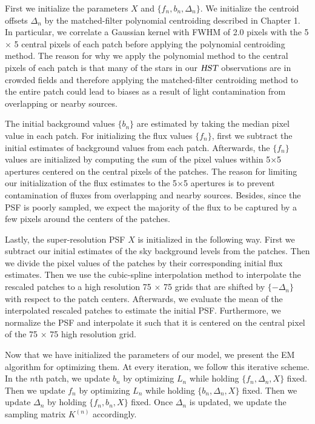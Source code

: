 First we initialize the parameters $X$ and $\{f_n , b_n , \Delta_n\}$. We initialize the centroid offsets ${\Delta_n}$ by the matched-filter polynomial centroiding 
described in Chapter 1. In particular, we correlate a Gaussian kernel with FWHM of 2.0 pixels with the 5 $\times$ 5 central pixels of each patch before applying 
the polynomial centroiding method. The reason for why we apply the polynomial method to the central pixels of each patch is that many of the stars in our ${\textsl{HST}}$ observations 
are in crowded fields and therefore applying the matched-filter centroiding method to the entire patch could lead to biases as a result of light contamination from overlapping 
or nearby sources. 

The initial background values $\{b_n\}$ are estimated by taking the median pixel value in each patch. For initializing the flux values $\{f_n\}$, first we subtract the initial 
estimates of background values from each patch. Afterwards, the $\{f_n\}$ values are initialized by computing the sum of the pixel values within 5$\times$5 apertures centered on 
the central pixels of the patches. The reason for limiting our initialization of the flux estimates to the 5$\times$5 apertures is to prevent contamination of fluxes from 
overlapping and nearby sources. Besides, since the PSF is poorly sampled, we expect the majority of the flux to be captured by a few pixels around the centers of the patches. 

Lastly, the super-resolution PSF $X$ is initialized in the following way. First we subtract our initial estimates of the sky background levels from the patches. Then we divide the 
pixel values of the patches by their corresponding initial flux estimates. Then we use the cubic-spline interpolation method to interpolate the rescaled patches to a high resolution 
75 $\times$ 75 grids that are shifted by $\{-\Delta_n\}$ with respect to the patch centers. Afterwards, we evaluate the mean of the interpolated rescaled patches 
to estimate the initial PSF. Furthermore, we normalize the PSF and interpolate it such that it is centered on the central pixel of the 75 $\times$ 75 high resolution grid.  

Now that we have initialized the parameters of our model, we present the EM algorithm for optimizing them. At every iteration, we follow this 
iterative scheme. In the $n$th patch, we update $b_n$ by optimizing $L_n$ while holding $\{f_n, \Delta_n, X\}$ fixed. Then 
we update $f_n$ by optimizing $L_n$ while holding $\{b_n, \Delta_n, X\}$ fixed. Then we update $\Delta_n$ by holding $\{f_n, b_n, X\}$ fixed. 
Once $\Delta_n$ is updated, we update the sampling matrix $K^{(n)}$ accordingly. 

